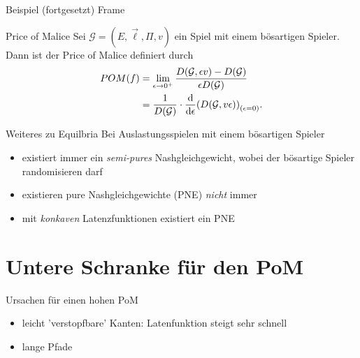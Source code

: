 \documentclass{beamer}
\begin{document}
\begin{frame}{Beispiel (fortgesetzt)}
	Frame
\end{frame}

\begin{frame}{Price of Malice}
	Sei $\mathcal G = (E, \vec{\ell}, \Pi, v)$ ein Spiel mit einem bösartigen Spieler.
	Dann ist der \alert{Price of Malice} definiert durch
	\begin{align*}
		POM(f) &= \lim_{\epsilon \to 0^+} \dfrac{D(\mathcal G, \epsilon v) - D(\mathcal G)}{\epsilon D(\mathcal G)}  \\
		&= \frac{1}{D(\mathcal G)} \cdot \dv{\epsilon}(D(\mathcal G, v \epsilon))_{(\epsilon = 0)}.
	\end{align*}
\end{frame}

\begin{frame}{Weiteres zu Equilbria}
	Bei Auslastungsspielen mit einem bösartigen Spieler 
	\begin{itemize}
		\item existiert immer ein \emph{semi-pures} Nashgleichgewicht, wobei der bösartige Spieler randomisieren darf
		\item existieren pure Nashgleichgewichte (PNE) \emph{nicht} immer
		\item mit \emph{konkaven} Latenzfunktionen existiert ein PNE
	\end{itemize}
\end{frame}

\section{Untere Schranke für den PoM}

\begin{frame}{Ursachen für einen hohen PoM}
	\begin{itemize}
		\item leicht 'verstopfbare' Kanten: Latenfunktion steigt sehr schnell
		\item lange Pfade
	\end{itemize}
\end{frame}
\end{document}
